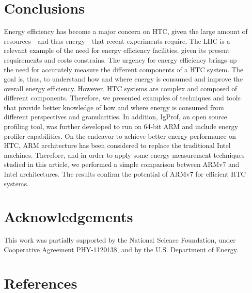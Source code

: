 \documentclass[a4paper]{jpconf}
\begin{document}
\section{Conclusions}
Energy efficiency has become a major concern on HTC, given the large amount of
resources - and thus energy - that recent experiments require. The LHC is
a relevant example of the need for energy efficiency facilities, given its present
requirements and costs constrains. The urgency for energy efficiency brings up the
need for accurately measure the different components of a HTC system. The goal is,
thus, to understand how and where energy is consumed and improve the overall 
energy efficiency. However, HTC systems are complex and composed of different 
components. Therefore, we presented examples of techniques and tools that provide
better knowledge of how and where energy is consumed from different perspectives
and granularities. In addition, IgProf, an open source profiling tool, was 
further developed to run on 64-bit ARM and include energy profiler capabilities. On 
the endeavor to achieve better energy performance on HTC, ARM architecture has
been considered to replace the traditional Intel machines. Therefore, and in 
order to apply some energy measurement techniques studied in this article, we
performed a simple comparison between ARMv7 and Intel architectures. The results 
confirm the potential of ARMv7 for efficient HTC systems.   


\section*{Acknowledgements}
This work was partially supported by the National Science Foundation, under
Cooperative Agreement PHY-1120138, and by the U.S. Department of Energy.

\section*{References}



\end{document}
